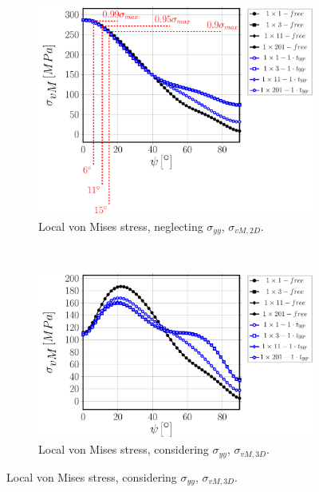 \begin{figure}[!hp]
    \begin{subfigure}[b]{0.475\textwidth}
        \includegraphics[width=\textwidth]{paperE/vf60-nodamage-vM2D.pdf}
        \caption{Local von Mises stress, neglecting $\sigma_{yy}$, $\sigma_{vM,2D}$.}\label{paperE:fig:stress-e}
    \end{subfigure} ~
    \begin{subfigure}[b]{0.475\textwidth}
        \includegraphics[width=\textwidth]{paperE/vf60-nodamage-vM3D.pdf}
        \caption{Local von Mises stress, considering $\sigma_{yy}$, $\sigma_{vM,3D}$.}\label{paperE:fig:stress-f}
    \end{subfigure}


\end{figure}
